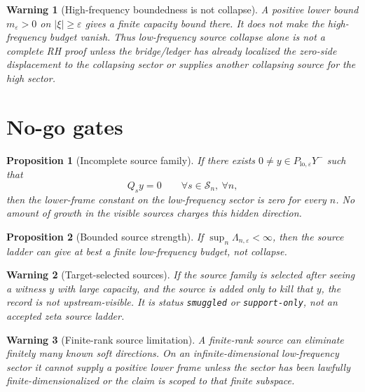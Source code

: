 \documentclass[11pt]{article}
\newtheorem{proposition}{Proposition}
\newtheorem{warning}{Warning}
\begin{document}
\begin{warning}[High-frequency boundedness is not collapse]
A positive lower bound $m_\varepsilon>0$ on $|\xi|\ge\varepsilon$ gives a finite capacity bound there.  It does not make the high-frequency budget vanish.  Thus low-frequency source collapse alone is not a complete RH proof unless the bridge/ledger has already localized the zero-side displacement to the collapsing sector or supplies another collapsing source for the high sector.
\end{warning}

\section{No-go gates}
\begin{proposition}[Incomplete source family]
If there exists $0\ne y\in P_{\mathrm{lo},\varepsilon}Y^-$ such that
\[
Q_sy=0\qquad\forall s\in\mathcal S_n,\ \forall n,
\]
then the lower-frame constant on the low-frequency sector is zero for every $n$.  No amount of growth in the visible sources charges this hidden direction.
\end{proposition}

\begin{proposition}[Bounded source strength]
If $\sup_n\Lambda_{n,\varepsilon}<\infty$, then the source ladder can give at best a finite low-frequency budget, not collapse.
\end{proposition}

\begin{warning}[Target-selected sources]
If the source family is selected after seeing a witness $y$ with large capacity, and the source is added only to kill that $y$, the record is not upstream-visible.  It is status \texttt{smuggled} or \texttt{support-only}, not an accepted zeta source ladder.
\end{warning}

\begin{warning}[Finite-rank source limitation]
A finite-rank source can eliminate finitely many known soft directions.  On an infinite-dimensional low-frequency sector it cannot supply a positive lower frame unless the sector has been lawfully finite-dimensionalized or the claim is scoped to that finite subspace.
\end{warning}
\end{document}
